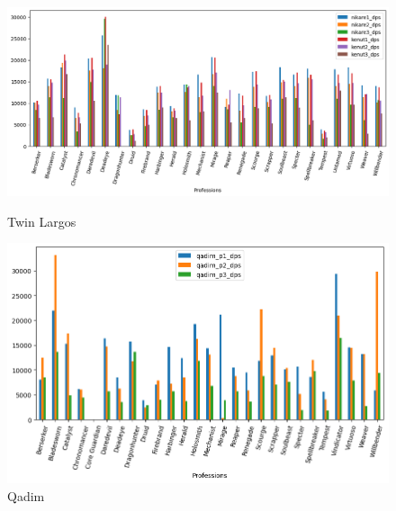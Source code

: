 \documentclass[12pt,a4paper]{article}
\begin{document}
    \begin{figure}[h!]
        
        \centering
        
        \includegraphics[width=1 \linewidth]{twins_dps_plot.png}
        \caption{Twin Largos}
        \includegraphics[width=1 \linewidth]{q1_dps_plot.png}
        \caption{Qadim}
    \end{figure}

    \newpage
\end{document}
